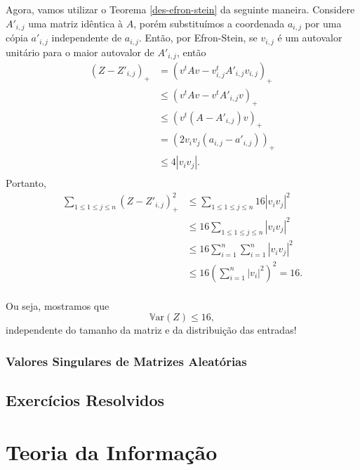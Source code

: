 \documentclass[12pt,a4paper,oneside]{book}
\theoremstyle{definition}
\theoremstyle{remark}
\numberwithin{equation}{section}
\newcommand{\Var}{\mathbb{V}\text{ar}}
\begin{document}
Agora, vamos utilizar o Teorema \ref{des-efron-stein} da seguinte maneira. Considere $A'_{i,j}$ uma matriz idêntica à $A$, porém substituímos a coordenada $a_{i,j}$ por uma cópia $a'_{i,j}$ independente de $a_{i,j}$. Então, por Efron-Stein, se $v_{i,j}$ é um autovalor unitário para o maior autovalor de $A'_{i,j}$, então
\begin{align*}
(Z-Z'_{i,j})_+ & = ( v^t A v -v_{i,j}^t A'_{i,j} v_{i,j})_+\\
& \leq ( v^tAv -v^tA'_{i,j} v)_+\\
& \leq ( v^t (A-A'_{i,j}) v)_+\\
& = (2 v_iv_j (a_{i,j}-a'_{i,j}))_+\\
& \leq 4 |v_iv_j|. \\
\end{align*}
Portanto,
\begin{align*}
\sum_{1\leq 1\leq j\leq n} (Z-Z'_{i,j})^2_+ &\leq \sum_{1\leq 1\leq j\leq n} 16|v_iv_j|^2\\
&\leq 16\sum_{1\leq 1\leq j\leq n} |v_iv_j|^2\\
&\leq 16\sum_{i=1}^n\sum_{i=1}^n |v_iv_j|^2\\
&\leq 16\left(\sum_{i=1}^n |v_i|^2\right)^2 = 16.\\
\end{align*}
\begin{tcolorbox}[colback = yellow!60]
Ou seja, mostramos que
$$\Var(Z)\leq 16, $$
independente do tamanho da matriz e da distribuição das entradas!
\end{tcolorbox}

\subsection{Valores Singulares de Matrizes Aleatórias}









\newpage
\section{Exercícios Resolvidos}








\chapter{Teoria da Informação}
\end{document}
